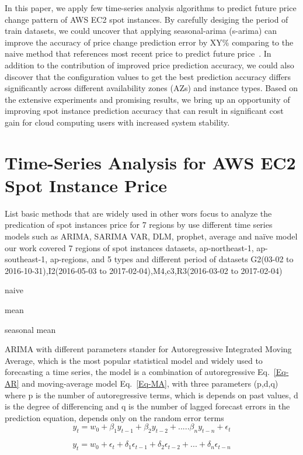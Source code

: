 \documentclass[graybox]{svmult}
\begin{document}
In this paper, we apply few time-series analysis algorithms to predict future price change pattern of AWS EC2 spot instances. By carefully desiging the period of train datasets, we could uncover that applying seasonal-arima (s-arima) can improve the accuracy of price change prediction error by XY\% comparing to the naive method that references most recent price to predict future price~\cite{deep-spot-cloud}. In addition to the contribution of improved price prediction accuracy, we could also discover that the configuration values to get the best prediction accuracy differs significantly across different availability zones (AZs) and instance types. Based on the extensive experiments and promising results, we bring up an opportunity of improving spot instance prediction accuracy that can result in significant cost gain for cloud computing users with increased system stability.


\section{Time-Series Analysis for AWS EC2 Spot Instance Price}
List basic methods that are widely used in other wors
focus to analyze the predication of spot instances price for 7 regions by use different time series models such as ARIMA, SARIMA VAR, DLM, prophet, average and naïve model
our work covered  7 regions of spot instances datasets, ap-northeast-1, ap-southeast-1, ap-regions, and 5 types and different period of datasets G2(03-02 to 2016-10-31),I2(2016-05-03 to 2017-02-04),M4,c3,R3(2016-03-02 to 2017-02-04)


naive

mean

seasonal mean

ARIMA with different parameters 
stander for Autoregressive Integrated Moving Average, which is the most popular statistical model and widely used to forecasting a time series, the model is a combination of  autoregressive Eq.~\ref{Eq-AR} and moving-average model Eq.~\ref{Eq-MA}, with three parameters  (p,d,q) where p is the number of autoregressive terms, which is depends on past values, d is the degree of differencing and q is the number of lagged forecast errors in the prediction equation, depends only on the random error terms 
\begin{equation}
 y_t = w_0 +\beta_1 y_{t-1}+ \beta_2 y_{t-2}+.....\beta_n y_{t-n}+\epsilon_t
\label{Eq-AR}
\end{equation}


\begin{equation}
 y_t = w_0 +\epsilon_t + \delta_1 \epsilon_{t-1}+  \delta_2 \epsilon_{t-2}+...+ \delta_n \epsilon_{t-n}
\label{Eq-MA}
\end{equation}
\end{document}
